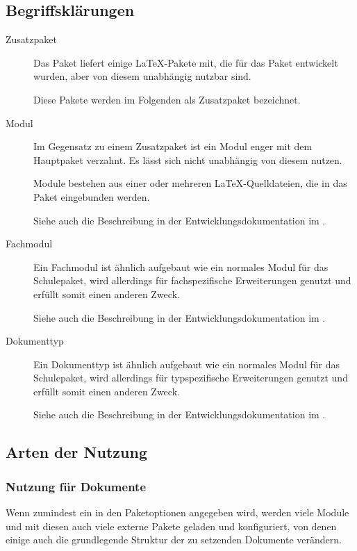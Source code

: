 \subsection{Begriffsklärungen}
	\label{sec:begriffe}
	\begin{description}
		\item[Zusatzpaket]
			Das Paket  liefert einige \LaTeX-Pakete mit,
			die für das Paket entwickelt wurden, aber von diesem
			unabhängig nutzbar sind.

			Diese Pakete werden im Folgenden als Zusatzpaket
			bezeichnet.

		\item[Modul]
			Im Gegensatz zu einem Zusatzpaket ist ein Modul
			enger mit dem Hauptpaket verzahnt. Es lässt sich nicht
			unabhängig von diesem nutzen.

			Module bestehen aus einer oder mehreren
			\LaTeX-Quelldateien, die in das Paket eingebunden werden.

			Siehe auch die Beschreibung in der
			Entwicklungsdokumentation im
			.

		\item[Fachmodul]
			Ein Fachmodul ist ähnlich aufgebaut wie ein	normales
			Modul für das Schulepaket, wird allerdings für
			fachspezifische Erweiterungen genutzt und erfüllt somit
			einen anderen Zweck.

			Siehe auch die Beschreibung in der
			Entwicklungsdokumentation im
			.

		\item[Dokumenttyp]
			Ein Dokumenttyp ist ähnlich aufgebaut wie ein normales
			Modul für das Schulepaket, wird allerdings für
			typspezifische Erweiterungen genutzt und erfüllt somit
			einen anderen Zweck.

			Siehe auch die Beschreibung in der
			Entwicklungsdokumentation im
			.

	\end{description}

\subsection{Arten der Nutzung}
	\subsubsection{Nutzung für Dokumente}
		Wenn zumindest ein  in den Paketoptionen angegeben
		wird, werden viele Module und mit diesen auch viele externe
		Pakete geladen und konfiguriert, von denen einige auch die
		grundlegende Struktur der zu setzenden Dokumente verändern.

